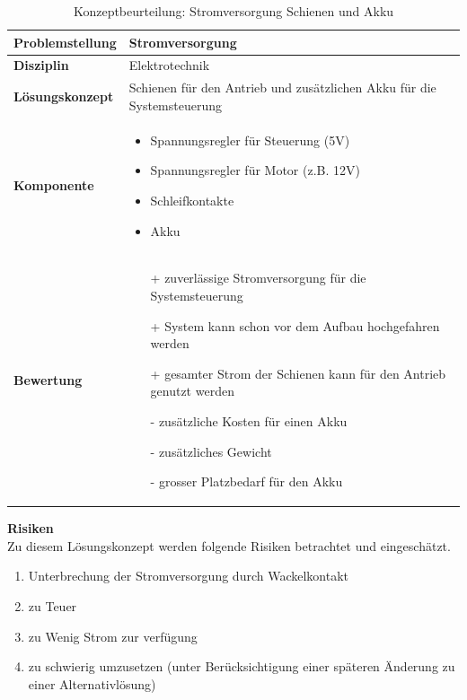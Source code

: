 \documentclass[../../main.tex]{subfiles}
\begin{document}
    \begin{flushleft}
        \begin{table}[H]
        \begin{tabular}{ | l | p{11cm} |}
        \hline
        \textbf{Problemstellung} & Stromversorgung \\ \hline
        \textbf{Disziplin} & Elektrotechnik \\ \hline
        \textbf{Lösungskonzept} & Schienen für den Antrieb und zusätzlichen Akku für die Systemsteuerung\\ \hline
        \textbf{Komponente} & \begin{itemize}
            \item Spannungsregler für Steuerung (5V)
            \item Spannungsregler für Motor (z.B. 12V)
            \item Schleifkontakte
            \item Akku
            \end{itemize}\\ \hline
        \textbf{Bewertung} &  \begin{itemize}
                                \item[+] zuverlässige Stromversorgung für die Systemsteuerung
                                \item[+] System kann schon vor dem Aufbau hochgefahren werden 
                                \item[+] gesamter Strom der Schienen kann für den Antrieb genutzt werden
                                \item[-] zusätzliche Kosten für einen Akku
                                \item[-] zusätzliches Gewicht
                                \item[-] grosser Platzbedarf für den Akku 
                              \end{itemize} \\ \hline
        \end{tabular}
        \caption{Konzeptbeurteilung: Stromversorgung Schienen und Akku}
        \label{tab:strom_konzept_schienen_und_akku}
    \end{table}
    \end{flushleft}

    \textbf{Risiken}\\
    Zu diesem Lösungskonzept werden folgende Risiken betrachtet und eingeschätzt.
    \begin{enumerate}[I]
        \item Unterbrechung der Stromversorgung durch Wackelkontakt
        \item zu Teuer
        \item zu Wenig Strom zur verfügung
        \item zu schwierig umzusetzen (unter Berücksichtigung einer späteren Änderung zu einer Alternativlösung)
    \end{enumerate}
\end{document}
